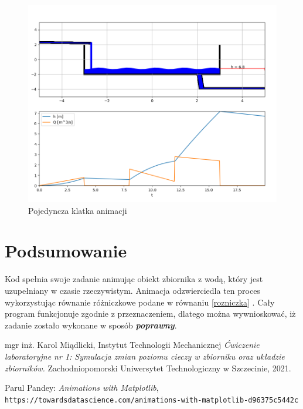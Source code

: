 \documentclass{article}
\begin{document}
\begin{figure}[h!]
    \centering
    \includegraphics[scale=0.5]{animacja}
    \caption{Pojedyncza klatka animacji}
    \label{fig:animacja}
\end{figure}

\section{Podsumowanie}
Kod spełnia swoje zadanie animując obiekt zbiornika z wodą, który jest uzupełniany w czasie rzeczywistym. Animacja odzwierciedla ten proces wykorzystując równanie różniczkowe podane w równaniu  \ref{rozniczka} . Cały program funkcjonuje zgodnie z przeznaczeniem, dlatego można wywnioskować, iż zadanie zostało wykonane w sposób \textbf{\textit{poprawny}}. 

\begin{thebibliography}{9}
mgr inż. Karol Miądlicki, Instytut Technologii Mechanicznej\newline
\textit{Ćwiczenie laboratoryjne nr 1: Symulacja zmian poziomu cieczy w zbiorniku oraz układzie zbiorników.} \newline
Zachodniopomorski Uniwersytet Technologiczny w Szczecinie, 2021.

Parul Pandey: \textit{Animations with Matplotlib},
\\\texttt{https://towardsdatascience.com/animations-with-matplotlib-d96375c5442c}
\end{thebibliography}
\end{document}
